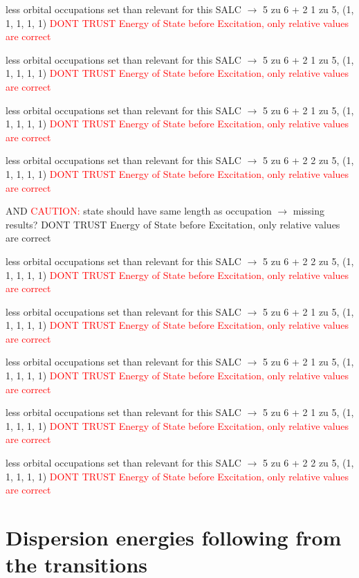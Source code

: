 \documentclass[12pt,a4paper]{article}
\begin{document}
less orbital occupations set than relevant for this SALC $\rightarrow$ 
5 zu 6 + 2 
1 zu 5, (1, 1, 1, 1, 1) 
\textcolor{red}{DONT TRUST \glqq{}Energy of State before Excitation\grqq{}, only relative values are correct}

less orbital occupations set than relevant for this SALC $\rightarrow$ 
5 zu 6 + 2 
1 zu 5, (1, 1, 1, 1, 1) 
\textcolor{red}{DONT TRUST \glqq{}Energy of State before Excitation\grqq{}, only relative values are correct}

less orbital occupations set than relevant for this SALC $\rightarrow$ 
5 zu 6 + 2 
1 zu 5, (1, 1, 1, 1, 1) 
\textcolor{red}{DONT TRUST \glqq{}Energy of State before Excitation\grqq{}, only relative values are correct}

less orbital occupations set than relevant for this SALC $\rightarrow$ 
5 zu 6 + 2 
2 zu 5, (1, 1, 1, 1, 1) 
\textcolor{red}{DONT TRUST \glqq{}Energy of State before Excitation\grqq{}, only relative values are correct}

 AND 	\textcolor{red}{CAUTION:} state should have same length as occupation $\rightarrow$ missing results?
	DONT TRUST \glqq{}Energy of State before Excitation\grqq{}, only relative values are correct

less orbital occupations set than relevant for this SALC $\rightarrow$ 
5 zu 6 + 2 
2 zu 5, (1, 1, 1, 1, 1) 
\textcolor{red}{DONT TRUST \glqq{}Energy of State before Excitation\grqq{}, only relative values are correct}

less orbital occupations set than relevant for this SALC $\rightarrow$ 
5 zu 6 + 2 
1 zu 5, (1, 1, 1, 1, 1) 
\textcolor{red}{DONT TRUST \glqq{}Energy of State before Excitation\grqq{}, only relative values are correct}

less orbital occupations set than relevant for this SALC $\rightarrow$ 
5 zu 6 + 2 
1 zu 5, (1, 1, 1, 1, 1) 
\textcolor{red}{DONT TRUST \glqq{}Energy of State before Excitation\grqq{}, only relative values are correct}

less orbital occupations set than relevant for this SALC $\rightarrow$ 
5 zu 6 + 2 
1 zu 5, (1, 1, 1, 1, 1) 
\textcolor{red}{DONT TRUST \glqq{}Energy of State before Excitation\grqq{}, only relative values are correct}

less orbital occupations set than relevant for this SALC $\rightarrow$ 
5 zu 6 + 2 
2 zu 5, (1, 1, 1, 1, 1) 
\textcolor{red}{DONT TRUST \glqq{}Energy of State before Excitation\grqq{}, only relative values are correct}


\newpage \section*{Dispersion energies following from the transitions}
\end{document}
